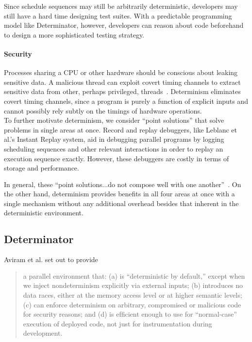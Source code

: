 Since schedule sequences may still be arbitrarily deterministic, developers may
still have a hard time designing test suites. With a predictable programming
model like Determinator, however, developers can reason about code beforehand
to design a more sophisticated testing strategy.

\paragraph{Security} Processes sharing a CPU or other hardware should be
conscious about leaking sensitive data. A malicious thread can exploit covert
timing channels to extract sensitive data from other, perhaps privileged,
threads~\cite{Aviram10cloud}. Determinism eliminates covert timing channels,
since a program is purely a function of explicit inputs and cannot possibly rely
subtly on the timings of hardware operations.
\\

To further motivate determinism, we consider ``point solutions'' that
solve problems in single areas at
once. Record and replay debuggers, like Leblanc et al.'s Instant Replay
system, aid in debugging parallel programs by logging scheduling sequences and
other relevant interactions in order to replay an execution sequence exactly.
However, these debuggers are costly in terms of storage and performance.
\iffalse Even with replay ability, the execution sequence is still arbitrary and
gives the programmer no intuition about the program's behavior. \fi
In general, these ``point solutions...do not compose well with one
another''~\cite{Bergan11}. On the other hand, determinism provides benefits in
all four areas at once with a single mechanism without any additional overhead
besides that inherent in the deterministic environment.

\subsection{Determinator}

Aviram et al. set out to provide
\begin{quote}
a parallel environment that:
(a) is ``deterministic by default,'' except when
we inject nondeterminism explicitly via external inputs;
(b) introduces no data races, either at the memory access level
or at higher semantic levels; (c)
can enforce determinism on arbitrary, compromised or
malicious code for security reasons; and (d) is efﬁcient
enough to use for ``normal-case'' execution of deployed
code, not just for instrumentation during development. \cite{Aviram10}
\end{quote}

